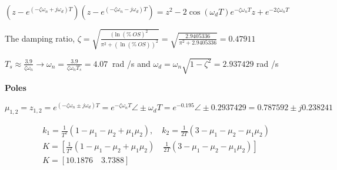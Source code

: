  $(z-e^{(-\zeta \omega_n+j\omega_d)T})(z-e^{(-\zeta \omega_n-j\omega_d)T})=z^2-2\cos(\omega_d T)e^{-\zeta \omega_n T}z+e^{-2 \zeta \omega_n T}$ 



The damping ratio, $\zeta= \sqrt{\frac{(\ln( \% \ OS )^2}{\pi^2 +(\ln( \% \ OS ))^2}}= \sqrt{\frac{2.9405336}{\pi^2+2.9405336}}=0.47911$


 $T_s \approx \frac{3.9}{ \zeta \omega_n} \rightarrow \omega_n =\frac{3.9}{\zeta \omega_n T_s}= 4.07 \ $ rad /s and $\omega_d = \omega_n \sqrt{1-\zeta^2}=2.937429 $ rad /s
 
 
 \textbf{Poles} %
 
 $ \mu_{1,2}=z_{1,2}=e^{(-\zeta \omega_n \pm j \omega_d)T}=e^{-\zeta \omega_n T} \angle \pm \omega_d T = %
 e^{-0.195} \angle \pm 0.2937429 =
 0.787592 \pm j0.238241$
 
 \begin{align*}
 & k_1 = \frac{1}{T^2}(1-\mu_1-\mu_2+\mu_1\mu_2), \quad k_2 = \frac{1}{2T}(3-\mu_1-\mu_2-\mu_1\mu_2) \\
 & K = [\frac{1}{T^2}(1-\mu_1-\mu_2+\mu_1\mu_2) \quad \frac{1}{2T}(3-\mu_1-\mu_2-\mu_1\mu_2) ] \\
 & K = [10.1876 \quad 3.7388]
 \end{align*}
